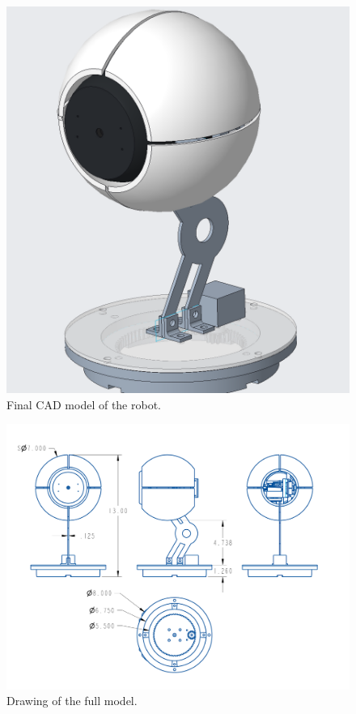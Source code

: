 \begin{figure}[h]
    \centering
    \includegraphics[width=0.4\linewidth]{Thesis/ch2/full-model.png}
    \caption{Final CAD model of the robot.}
    \label{fig:full-model}
\end{figure}
\begin{figure}[h]
    \centering
    \includegraphics[width=0.8\linewidth]{Thesis/ch2/full-drw.pdf}
    \caption{Drawing of the full model.}
    \label{fig:full-model-drw}
\end{figure}